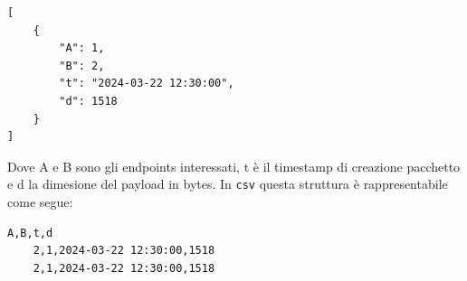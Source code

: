 \documentclass[binding=0.6cm]{sapthesis}
\begin{document}
 {\scriptsize %
\begin{lstlisting}[caption={Pacchetto di rete rappresentato in \texttt{json}}, label={fig:packet_example}]
[    
    {
        "A": 1,
        "B": 2,
        "t": "2024-03-22 12:30:00",
        "d": 1518
    }
]
\end{lstlisting}
 }

Dove A e B sono gli endpoints interessati, t è il timestamp di creazione pacchetto e d 
la dimesione del payload in bytes. In \texttt{csv} questa struttura è rappresentabile come segue:

{\scriptsize %
\begin{lstlisting}[caption={Pacchetti di rete rappresentati in \texttt{csv}}]
    A,B,t,d
    2,1,2024-03-22 12:30:00,1518
    2,1,2024-03-22 12:30:00,1518
\end{lstlisting}
}
\end{document}
